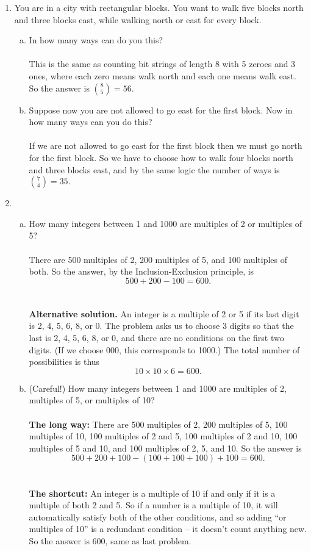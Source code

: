 \documentclass[12pt]{article}
\begin{document}
\begin{enumerate}[1.]
\begin{enumerate}[(a)]
\end{enumerate}

\item
You are in a city with rectangular blocks. You want to walk five blocks north and three blocks east,
while walking north or east for every block.
\begin{enumerate}[(a)]
\item
In how many ways can do you this?
\\
\\
This is the same as counting bit strings of length 8 with 5 zeroes and 3 ones, where each zero means walk north
and each one means walk east. So the answer is ${8 \choose 5} = 56$.

\item
Suppose now you are not allowed to go east for the first block. Now in how many ways can you do this?
\\
\\
If we are not allowed to go east for the first block then we must go north for the first block. So we have
to choose how to walk four blocks north and three blocks east, and by the same logic the number of ways is
${7 \choose 4} = 35.$
\end{enumerate}

\item
\begin{enumerate}[(a)]
\item
How many integers between 1 and 1000 are multiples of 2 or multiples of 5?
\\
\\
There are 500 multiples of 2, 200 multiples of 5, and 100 multiples of both. So the answer, by the Inclusion-Exclusion
principle, is 
$$500 + 200 - 100 = 600.$$
\\
\\
{\bf Alternative solution.} An integer is a multiple of 2 or 5 if its last digit is 2, 4, 5, 6, 8, or 0.
The problem asks us to choose 3 digits so that the last is 2, 4, 5, 6, 8, or 0, and there are no conditions
on the first two digits. (If we choose 000, this corresponds to 1000.) The total number of possibilities is
thus 
$$10 \times 10 \times 6 = 600.$$

\item
(Careful!) How many integers between 1 and 1000 are multiples of 2, multiples of 5, or multiples of 10?
\\
\\
{\bf The long way:} There are 500 multiples of 2, 200 multiples of 5, 100 multiples of 10, 100 multiples of 2 and 5,
100 multiples of 2 and 10, 100 multiples of 5 and 10, and 100 multiples of 2, 5, and 10. So the answer is
$$500 + 200 + 100 - (100 + 100 + 100) + 100 = 600.$$
\\
\\
{\bf The shortcut:} An integer is a multiple of 10 if and only if it is a multiple of both 2 and 5. So if a number
is a multiple of 10, it will automatically satisfy both of the other conditions, and so adding ``or multiples of 10''
is a redundant condition -- it doesn't count anything new. So the answer is 600, same as last problem.


\end{enumerate}
\end{enumerate}
\end{document}
